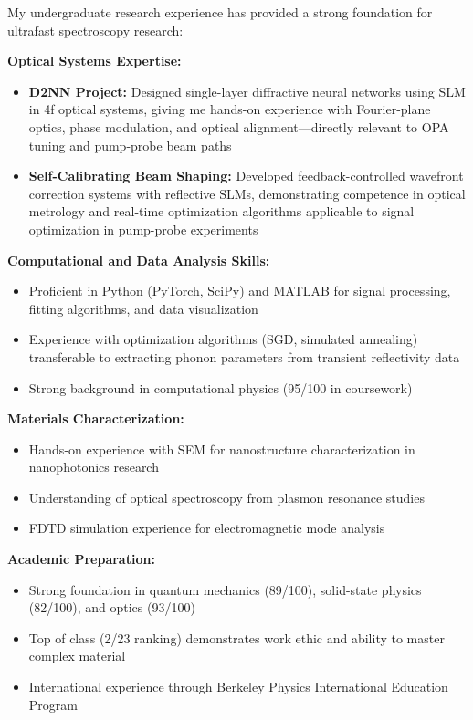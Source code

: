 \documentclass[12pt,a4paper]{article}
\begin{document}
My undergraduate research experience has provided a strong foundation for ultrafast spectroscopy research:

\textbf{Optical Systems Expertise:}
\begin{itemize}
    \item \textbf{D2NN Project:} Designed single-layer diffractive neural networks using SLM in 4f optical systems, giving me hands-on experience with Fourier-plane optics, phase modulation, and optical alignment—directly relevant to OPA tuning and pump-probe beam paths
    \item \textbf{Self-Calibrating Beam Shaping:} Developed feedback-controlled wavefront correction systems with reflective SLMs, demonstrating competence in optical metrology and real-time optimization algorithms applicable to signal optimization in pump-probe experiments
\end{itemize}

\textbf{Computational and Data Analysis Skills:}
\begin{itemize}
    \item Proficient in Python (PyTorch, SciPy) and MATLAB for signal processing, fitting algorithms, and data visualization
    \item Experience with optimization algorithms (SGD, simulated annealing) transferable to extracting phonon parameters from transient reflectivity data
    \item Strong background in computational physics (95/100 in coursework)
\end{itemize}

\textbf{Materials Characterization:}
\begin{itemize}
    \item Hands-on experience with SEM for nanostructure characterization in nanophotonics research
    \item Understanding of optical spectroscopy from plasmon resonance studies
    \item FDTD simulation experience for electromagnetic mode analysis
\end{itemize}

\textbf{Academic Preparation:}
\begin{itemize}
    \item Strong foundation in quantum mechanics (89/100), solid-state physics (82/100), and optics (93/100)
    \item Top of class (2/23 ranking) demonstrates work ethic and ability to master complex material
    \item International experience through Berkeley Physics International Education Program
\end{itemize}
\end{document}
